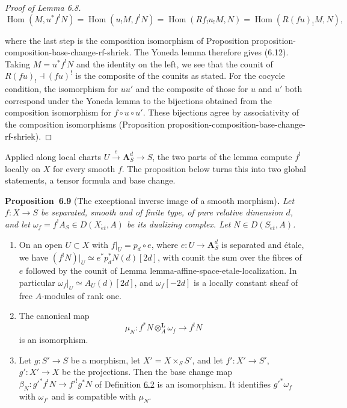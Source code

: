 \documentclass[11pt]{article}
\newenvironment{bpstatement}[2]{\par\addvspace{0.6\baselineskip}\noindent\textbf{#1}#2\textbf{.}\enspace\ignorespaces}
  {\par\addvspace{0.4\baselineskip}}
\newenvironment{bpstatementit}[2]{\begin{bpstatement}{#1}{#2}\itshape\ignorespaces}{\end{bpstatement}}
\providecommand{\Hom}{}\renewcommand{\Hom}{\operatorname{Hom}}
\begin{document}
\begin{proof}[{Proof of Lemma 6.8}]
\[
\Hom(M,u^*f^!N)
=\Hom(u_!M,f^!N)
=\Hom(Rf_!u_!M,N)
=\Hom(R(fu)_!M,N),
\]

where the last step is the composition isomorphism of Proposition proposition-composition-base-change-rf-shriek. The Yoneda lemma therefore gives (6.12). Taking \(M=u^*f^!N\) and the identity on the left, we see that the counit of \(R(fu)_!\dashv(fu)^!\) is the composite of the counits as stated. For the cocycle condition, the isomorphism for \(uu'\) and the composite of those for \(u\) and \(u'\) both correspond under the Yoneda lemma to the bijections obtained from the composition isomorphism for \(f\circ u\circ u'\). These bijections agree by associativity of the composition isomorphisms (Proposition proposition-composition-base-change-rf-shriek).
\end{proof}

\label{bp541}%
Applied along local charts \(U\xrightarrow{e}\mathbf A^d_S\to S\), the two parts of the lemma compute \(f^!\) locally on \(X\) for every smooth \(f\). The proposition below turns this into two global statements, a tensor formula and base change.

\label{bp542}%
\begin{bpstatementit}{Proposition~6.9}{ (The exceptional inverse image of a smooth morphism)}
Let \(f:X\to S\) be separated, smooth and of finite type, of pure relative dimension \(d\), and let \(\omega_f=f^!A_S\in D(X_{\acute{e}t},A)\) be its dualizing complex. Let \(N\in D(S_{\acute{e}t},A)\).

\begin{enumerate}
\item On an open \(U\subset X\) with \(f|_U=p_d\circ e\), where \(e:U\to\mathbf A^d_S\) is separated and étale, we have \((f^!N)|_U\simeq e^*p_d^*N(d)[2d]\), with counit the sum over the fibres of \(e\) followed by the counit of Lemma lemma-affine-space-etale-localization. In particular \(\omega_f|_U\simeq A_U(d)[2d]\), and \(\omega_f[-2d]\) is a locally constant sheaf of free \(A\)-modules of rank one.
\item The canonical map \[
   \mu_N:f^*N\otimes_A^{\mathbf L}\omega_f\longrightarrow f^!N
   \tag{6.13}
   \] is an isomorphism.
\item Let \(g:S'\to S\) be a morphism, let \(X'=X\times_SS'\), and let \(f':X'\to S'\), \(g':X'\to X\) be the projections. Then the base change map \(\beta_N:g'^*f^!N\to f'^!g^*N\) of Definition \hyperref[bp519]{6.2} is an isomorphism. It identifies \(g'^*\omega_f\) with \(\omega_{f'}\) and is compatible with \(\mu_N\).
\end{enumerate}
\end{bpstatementit}
\end{document}
